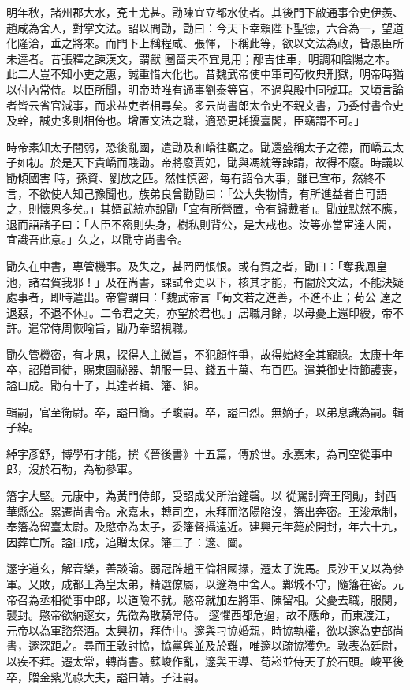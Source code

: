 \begin{pinyinscope}
 明年秋，諸州郡大水，兗土尤甚。勖陳宜立都水使者。其後門下啟通事令史伊羨、趙咸為舍人，對掌文法。詔以問勖，勖曰：今天下幸賴陛下聖德，六合為一，望道化隆洽，垂之將來。而門下上稱程咸、張惲，下稱此等，欲以文法為政，皆愚臣所未達者。昔張釋之諫漢文，謂獸
 圈嗇夫不宜見用；邴吉住車，明調和陰陽之本。此二人豈不知小吏之惠，誠重惜大化也。昔魏武帝使中軍司荀攸典刑獄，明帝時猶以付內常侍。以臣所聞，明帝時唯有通事劉泰等官，不過與殿中同號耳。又頃言論者皆云省官減事，而求益吏者相尋矣。多云尚書郎太令史不親文書，乃委付書令史及幹，誠吏多則相倚也。增置文法之職，適恐更耗擾臺閣，臣竊謂不可。」



 時帝素知太子闇弱，恐後亂國，遣勖及和嶠往觀之。勖還盛稱太子之德，而嶠云太子如初。於是天下貴嶠而賤勖。帝將廢賈妃，勖與馮紞等諫請，故得不廢。時議以勖傾國害
 時，孫資、劉放之匹。然性慎密，每有詔令大事，雖已宣布，然終不言，不欲使人知己豫聞也。族弟良曾勸勖曰：「公大失物情，有所進益者自可語之，則懷恩多矣。」其婿武統亦說勖「宜有所營置，令有歸戴者」。勖並默然不應，退而語諸子曰：「人臣不密則失身，樹私則背公，是大戒也。汝等亦當宦達人間，宜識吾此意。」久之，以勖守尚書令。



 勖久在中書，專管機事。及失之，甚罔罔悵恨。或有賀之者，勖曰：「奪我鳳皇池，諸君賀我邪！」及在尚書，課試令史以下，核其才能，有闇於文法，不能決疑處事者，即時遣出。帝嘗謂曰：「魏武帝言『荀文若之進善，不進不止；荀公
 達之退惡，不退不休』。二令君之美，亦望於君也。」居職月餘，以母憂上還印綬，帝不許。遣常侍周恢喻旨，勖乃奉詔視職。



 勖久管機密，有才思，探得人主微旨，不犯顏忤爭，故得始終全其寵祿。太康十年卒，詔贈司徒，賜東園祕器、朝服一具、錢五十萬、布百匹。遣兼御史持節護喪，謚曰成。勖有十子，其達者輯、籓、組。



 輯嗣，官至衛尉。卒，謚曰簡。子畯嗣。卒，謚曰烈。無嫡子，以弟息識為嗣。輯子綽。



 綽字彥舒，博學有才能，撰《晉後書》十五篇，傳於世。永嘉末，為司空從事中郎，沒於石勒，為勒參軍。



 籓字大堅。元康中，為黃門侍郎，受詔成父所治鐘磬。以
 從駕討齊王冏勛，封西華縣公。累遷尚書令。永嘉末，轉司空，未拜而洛陽陷沒，籓出奔密。王浚承制，奉籓為留臺太尉。及愍帝為太子，委籓督攝遠近。建興元年薨於開封，年六十九，因葬亡所。謚曰成，追贈太保。籓二子：邃、闓。



 邃字道玄，解音樂，善談論。弱冠辟趙王倫相國掾，遷太子洗馬。長沙王乂以為參軍。乂敗，成都王為皇太弟，精選僚屬，以邃為中舍人。鄴城不守，隨籓在密。元帝召為丞相從事中郎，以道險不就。愍帝就加左將軍、陳留相。父憂去職，服闋，襲封。愍帝欲納邃女，先徵為散騎常侍。
 邃懼西都危逼，故不應命，而東渡江，元帝以為軍諮祭酒。太興初，拜侍中。邃與刁協婚親，時協執權，欲以邃為吏部尚書，邃深距之。尋而王敦討協，協黨與並及於難，唯邃以疏協獲免。敦表為廷尉，以疾不拜。遷太常，轉尚書。蘇峻作亂，邃與王導、荀崧並侍天子於石頭。峻平後卒，贈金紫光祿大夫，謚曰靖。子汪嗣。




\end{pinyinscope}
